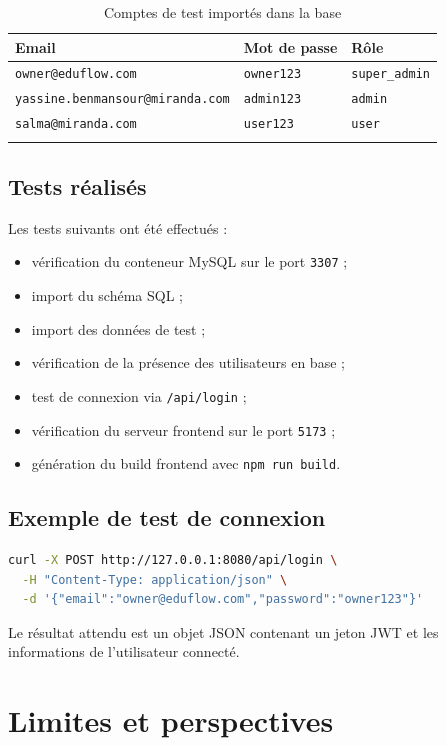 \documentclass[12pt,a4paper]{report}
\begin{document}
\begin{longtable}{|p{6cm}|p{4cm}|p{4cm}|}
\hline
\textbf{Email} & \textbf{Mot de passe} & \textbf{Rôle} \\
\hline
\texttt{owner@eduflow.com} & \texttt{owner123} & \texttt{super\_admin} \\
\hline
\texttt{yassine.benmansour@miranda.com} & \texttt{admin123} & \texttt{admin} \\
\hline
\texttt{salma@miranda.com} & \texttt{user123} & \texttt{user} \\
\hline
\caption{Comptes de test importés dans la base}
\end{longtable}

\section{Tests réalisés}

Les tests suivants ont été effectués :

\begin{itemize}[label=--]
    \item vérification du conteneur MySQL sur le port \texttt{3307} ;
    \item import du schéma SQL ;
    \item import des données de test ;
    \item vérification de la présence des utilisateurs en base ;
    \item test de connexion via \texttt{/api/login} ;
    \item vérification du serveur frontend sur le port \texttt{5173} ;
    \item génération du build frontend avec \texttt{npm run build}.
\end{itemize}

\section{Exemple de test de connexion}

\begin{lstlisting}[language=bash]
curl -X POST http://127.0.0.1:8080/api/login \
  -H "Content-Type: application/json" \
  -d '{"email":"owner@eduflow.com","password":"owner123"}'
\end{lstlisting}

Le résultat attendu est un objet JSON contenant un jeton JWT et les informations de l'utilisateur connecté.

\chapter{Limites et perspectives}
\end{document}
